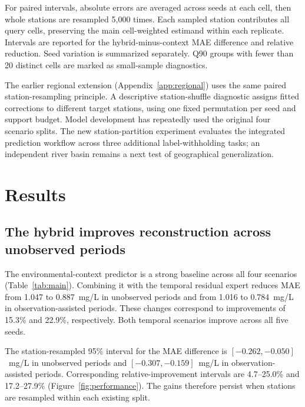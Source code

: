 \documentclass[11pt]{article}
\begin{document}
For paired intervals, absolute errors are averaged across seeds at each cell, then whole stations are resampled 5,000 times. Each sampled station contributes all query cells, preserving the main cell-weighted estimand within each replicate. Intervals are reported for the hybrid-minus-context MAE difference and relative reduction. Seed variation is summarized separately. Q90 groups with fewer than 20 distinct cells are marked as small-sample diagnostics.

The earlier regional extension (Appendix~\ref{app:regional}) uses the same paired station-resampling principle. A descriptive station-shuffle diagnostic assigns fitted corrections to different target stations, using one fixed permutation per seed and support budget. Model development has repeatedly used the original four scenario splits. The new station-partition experiment evaluates the integrated prediction workflow across three additional label-withholding tasks; an independent river basin remains a next test of geographical generalization.

\FloatBarrier
\section{Results}

\subsection{The hybrid improves reconstruction across unobserved periods}
The environmental-context predictor is a strong baseline across all four scenarios (Table~\ref{tab:main}). Combining it with the temporal residual expert reduces MAE from 1.047 to 0.887~mg/L in unobserved periods and from 1.016 to 0.784~mg/L in observation-assisted periods. These changes correspond to improvements of 15.3\% and 22.9\%, respectively. Both temporal scenarios improve across all five seeds.

The station-resampled 95\% interval for the MAE difference is $[-0.262,-0.050]$~mg/L in unobserved periods and $[-0.307,-0.159]$~mg/L in observation-assisted periods. Corresponding relative-improvement intervals are 4.7--25.0\% and 17.2--27.9\% (Figure~\ref{fig:performance}). The gains therefore persist when stations are resampled within each existing split.
\end{document}
